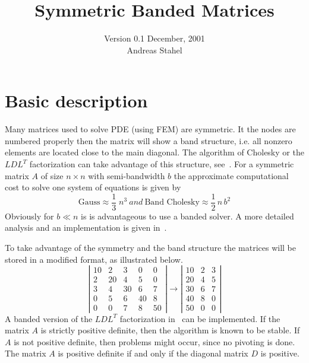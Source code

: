 \documentclass[11pt]{article}
\title{Symmetric Banded Matrices}
\author{Version 0.1 December, 2001\\
Andreas Stahel
}
\newcommand{\text}[1]{\ #1 \ }
\newcommand{\currdir}{./}
\begin{document}
\maketitle


\def\currdir{./}
\setlength{\marginparwidth}{25mm}

\tableofcontents

\section{Basic description}
Many  matrices used to solve PDE (using FEM) are symmetric. It the
nodes are numbered properly then the matrix will show
a band structure, i.e. all nonzero elements are located close to the main
diagonal. The algorithm of Cholesky or the $LDL^T$ factorization can take
advantage of this structure, see~\cite{GoluVanLoan96}. For a symmetric
matrix $A$ of size $n\times n$ with semi-bandwidth $b$ the approximate
computational cost to solve one system of equations is 
given by
\[ \mbox{Gauss}\approx \frac{1}{3}\;n^3 \text{and}
 \mbox{Band Cholesky}\approx \frac{1}{2}\,n\,b^2\]
Obviously for $b\ll n$ is is advantageous to
use a banded solver. A more detailed analysis and an implementation is
given in~\cite{VarFem}.

To take advantage of the symmetry and the band structure the matrices will
be stored in a modified format, as illustrated below.
\[\left|
  \begin{array}{ccccc}
   10&2&3&0&0\\2&20&4&5&0\\3&4&30&6&7\\0&5&6&40&8\\0&0&7&8&50
  \end{array} \right|
\longrightarrow
  \left| \begin{array}{ccc}
   10&2&3\\20&4&5\\30&6&7\\40&8&0\\50&0&0
  \end{array} \right| \]
A banded version of the $LDL^T$ factorization in~\cite{GoluVanLoan96}
can be implemented. If the matrix $A$ is strictly positive definite, then
the algorithm is known to be stable. If $A$ is not positive definite, then
problems might occur, since no pivoting is done. The matrix $A$ is
positive definite if and only if the diagonal matrix $D$ is positive.
\end{document}
